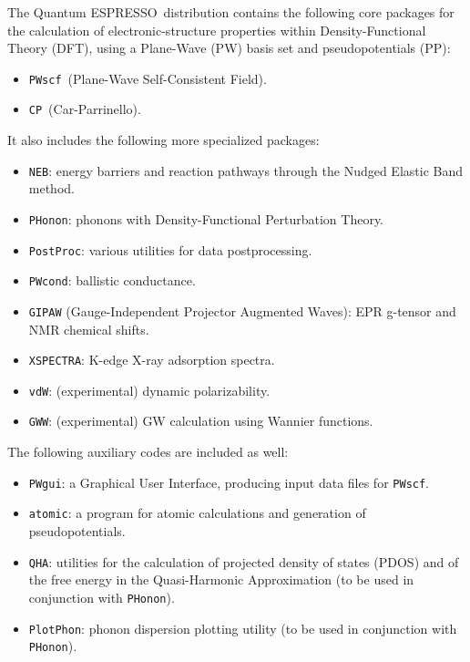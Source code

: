 \documentclass[12pt,a4paper]{article}
\def\qe{{\sc Quantum ESPRESSO}}
\def\PWscf{\texttt{PWscf}}
\def\PHonon{\texttt{PHonon}}
\def\CP{\texttt{CP}}
\def\PostProc{\texttt{PostProc}}
\begin{document}
The \qe\ distribution contains the following core packages 
for the calculation of electronic-structure properties within
Density-Functional Theory (DFT), using a Plane-Wave (PW) basis set 
and pseudopotentials (PP):
\begin{itemize}
  \item \PWscf\ (Plane-Wave Self-Consistent Field).
  \item \CP\ (Car-Parrinello).
\end{itemize}
It also includes the following more specialized packages:
\begin{itemize}
  \item \texttt{NEB}:
        energy barriers and reaction pathways through the Nudged Elastic Band method.
  \item \PHonon:
        phonons with Density-Functional Perturbation Theory.
  \item \PostProc: various utilities for data postprocessing.
  \item \texttt{PWcond}:
        ballistic conductance.
  \item \texttt{GIPAW} 
  (Gauge-Independent Projector Augmented Waves):
        EPR g-tensor and NMR chemical shifts.
  \item \texttt{XSPECTRA}:
        K-edge X-ray adsorption spectra.
  \item \texttt{vdW}:
        (experimental) dynamic polarizability. 
  \item \texttt{GWW}:
        (experimental) GW calculation using Wannier functions.
\end{itemize}
The following auxiliary codes are included as well:
\begin{itemize}
\item \texttt{PWgui}:
      a Graphical User Interface, producing input data files for 
      \PWscf.
\item \texttt{atomic}:
      a program for atomic calculations and generation of pseudopotentials.
\item \texttt{QHA}:
      utilities for the calculation of projected density of states (PDOS)
      and of the free energy in the Quasi-Harmonic Approximation (to be
      used in conjunction with \PHonon).
\item \texttt{PlotPhon}:
      phonon dispersion plotting utility (to be
      used in conjunction with \PHonon).
\end{itemize}
\end{document}
